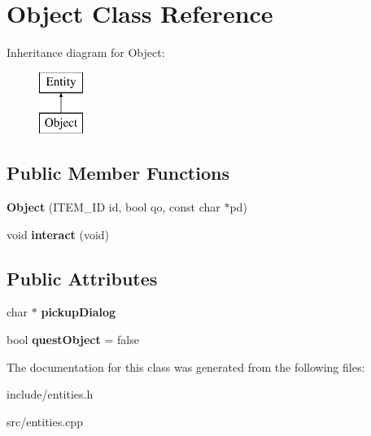 \hypertarget{classObject}{}\section{Object Class Reference}
\label{classObject}
Inheritance diagram for Object\+:\begin{figure}[H]
\begin{center}
\leavevmode
\includegraphics[height=2.000000cm]{classObject}
\end{center}
\end{figure}
\subsection*{Public Member Functions}
\begin{DoxyCompactItemize}
\item 
\hypertarget{classObject_a18c98f4426616655aa99e8b2240dd636}{}{\bfseries Object} (I\+T\+E\+M\+\_\+\+I\+D id, bool qo, const char $\ast$pd)\label{classObject_a18c98f4426616655aa99e8b2240dd636}

\item 
\hypertarget{classObject_ab95de774fb418c35ebb951a1ba76cc14}{}void {\bfseries interact} (void)\label{classObject_ab95de774fb418c35ebb951a1ba76cc14}

\end{DoxyCompactItemize}
\subsection*{Public Attributes}
\begin{DoxyCompactItemize}
\item 
\hypertarget{classObject_af7a4246d7ef42249fa87080dbe75457d}{}char $\ast$ {\bfseries pickup\+Dialog}\label{classObject_af7a4246d7ef42249fa87080dbe75457d}

\item 
\hypertarget{classObject_a6e1f7d9e24ca1a0da0b28fa407ca82b4}{}bool {\bfseries quest\+Object} = false\label{classObject_a6e1f7d9e24ca1a0da0b28fa407ca82b4}

\end{DoxyCompactItemize}


The documentation for this class was generated from the following files\+:\begin{DoxyCompactItemize}
\item 
include/entities.\+h\item 
src/entities.\+cpp\end{DoxyCompactItemize}
